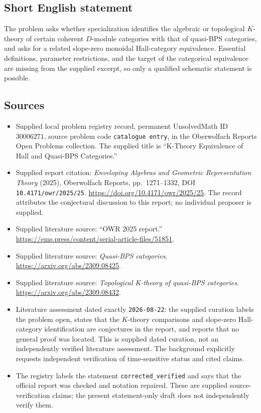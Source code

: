 \documentclass[11pt]{article}
\begin{document}
\subsection{Short English statement}
The problem asks whether specialization identifies the algebraic or topological \(K\)-theory of certain coherent \(D\)-module categories with that of quasi-BPS categories, and asks for a related slope-zero monoidal Hall-category equivalence. Essential definitions, parameter restrictions, and the target of the categorical equivalence are missing from the supplied excerpt, so only a qualified schematic statement is possible.
\subsection{Sources}
\begin{itemize}
\item Supplied local problem registry record, permanent UnsolvedMath ID \(30006271\), source problem code \texttt{catalogue entry}, in the Oberwolfach Reports Open Problems collection. The supplied title is ``K-Theory Equivalence of Hall and Quasi-BPS Categories.''
\item Supplied report citation: \emph{Enveloping Algebras and Geometric Representation Theory} (2025), Oberwolfach Reports, pp.~1271--1332, DOI \texttt{10.4171/owr/2025/25}. \url{https://doi.org/10.4171/owr/2025/25}. The record attributes the conjectural discussion to this report; no individual proposer is supplied.
\item Supplied literature source: ``OWR 2025 report.'' \url{https://ems.press/content/serial-article-files/51851}.
\item Supplied literature source: \emph{Quasi-BPS categories}. \url{https://arxiv.org/abs/2309.08425}.
\item Supplied literature source: \emph{Topological K-theory of quasi-BPS categories}. \url{https://arxiv.org/abs/2309.08432}.
\item Literature assessment dated exactly \texttt{2026-08-22}: the supplied curation labels the problem open, states that the \(K\)-theory comparisons and slope-zero Hall-category identification are conjectures in the report, and reports that no general proof was located. This is supplied dated curation, not an independently verified literature assessment. The background explicitly requests independent verification of time-sensitive status and cited claims.
\item The registry labels the statement \texttt{corrected\_verified} and says that the official report was checked and notation repaired. These are supplied source-verification claims; the present statement-only draft does not independently verify them.
\end{itemize}
\end{document}
